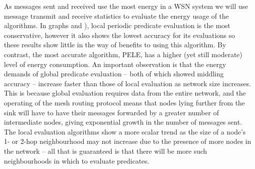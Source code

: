 As messages sent and received use the most energy in a WSN system \cite{?} we will use message transmit and receive statistics to evaluate the energy usage of the algorithms. In graphs  and  ), local periodic predicate evaluation is the most conservative, however it also shows the lowest accuracy for its evaluations so these results show little in the way of benefits to using this algorithm. By contrast, the most accurate algorithm, PELE, has a higher (yet still moderate) level of energy consumption. An important observation is that the energy demands of global predicate evaluation -- both of which showed middling accuracy -- increase faster than those of local evaluation as network size increases. This is because global evaluation requires data from the entire network, and the operating of the mesh routing protocol means that nodes lying further from the sink will have to have their messages forwarded by a greater number of intermediate nodes, giving exponential growth in the number of messages sent. The local evaluation algorithms show a more scalar trend as the size of a node's 1- or 2-hop neighbourhood may not increase due to the presence of more nodes in the network -- all that is guaranteed is that there will be more such neighbourhoods in which to evaluate predicates.


